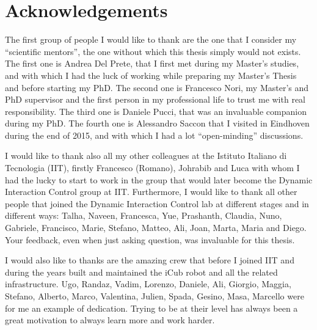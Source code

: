 
\chapter*{Acknowledgements}



The first group of people I would like to thank are the one that I consider my ``scientific mentors'', the one without which this thesis simply would not exists. The first one is Andrea Del Prete, that I first met during my Master's studies, and with which I had the luck of working while preparing my Master's Thesis and before starting my PhD. The second one is Francesco Nori, my Master's and PhD supervisor and the first person in my professional life to trust me with real responsibility. The third one is Daniele Pucci, that was an invaluable companion during my PhD. The fourth one is Alessandro Saccon that I visited in Eindhoven during the end of 2015, and with which I had a lot ``open-minding'' discussions. 

I would like to thank also all my other colleagues at the Istituto Italiano di Tecnologia (IIT), firstly Francesco (Romano), Johrabib and Luca with whom I had the lucky to start to work in the group that would later become the Dynamic Interaction Control group at IIT. Furthermore, I would like to thank all other people that joined the Dynamic Interaction Control lab at different stages and in different ways: Talha, Naveen, Francesca, Yue, Prashanth, Claudia, Nuno, Gabriele, Francisco, Marie, Stefano, Matteo, Ali, Joan, Marta, Maria and Diego. Your feedback, even when just asking question, was invaluable for this thesis. 

I would also like to thanks are the amazing crew that before I joined IIT and during the years built and maintained the iCub robot and all the related infrastructure. Ugo, Randaz, Vadim, Lorenzo, Daniele, Ali, Giorgio, Maggia, Stefano, Alberto, Marco, Valentina, Julien, Spada, Gesino, Masa, Marcello were for me an example of dedication. Trying to be at their level has always been a great motivation to always learn more and work harder. 

